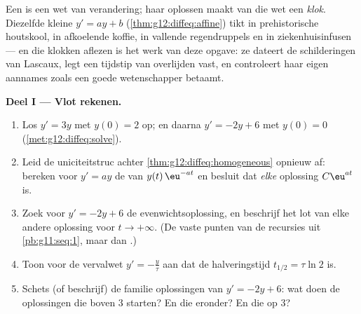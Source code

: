 \begin{problem}
\label{pb:g12:diffeq:1}
Een  is een wet van verandering; haar oplossen maakt
van die wet een \emph{klok}. Diezelfde kleine  $y' = ay + b$
(\cref{thm:g12:diffeq:affine}) tikt in prehistorische houtskool, in
afkoelende koffie, in vallende regendruppels en in ziekenhuisinfusen --- en
die klokken aflezen is het werk van deze opgave: ze dateert de
schilderingen van Lascaux, legt een tijdstip van overlijden vast, en
controleert haar eigen aannames zoals een goede wetenschapper betaamt.

\medskip
\noindent\textbf{Deel I --- Vlot rekenen.}
\begin{enumerate}
  \item Los $y' = 3y$ met $y(0) = 2$ op; en daarna $y' = -2y + 6$ met
        $y(0) = 0$ (\cref{met:g12:diffeq:solve}).
  \item Leid de uniciteitstruc achter \cref{thm:g12:diffeq:homogeneous}
        opnieuw af: bereken voor $y' = ay$ de  van
        $y(t)\,\eu^{-at}$ en besluit dat \emph{elke} oplossing $C\eu^{at}$
        is.
  \item Zoek voor $y' = -2y + 6$ de evenwichtsoplossing, en beschrijf het lot
        van elke andere oplossing voor $t \to +\infty$. (De vaste punten van
        de recursies uit \cref{pb:g11:seq:1}, maar dan .)
  \item Toon voor de vervalwet $y' = -\frac{y}{\tau}$ aan dat de
        halveringstijd $t_{1/2} = \tau \ln 2$ is.
  \item Schets (of beschrijf) de familie oplossingen van $y' = -2y + 6$: wat
        doen de oplossingen die boven $3$ starten? En die eronder? En die op
        $3$?
\end{enumerate}


\end{problem}

